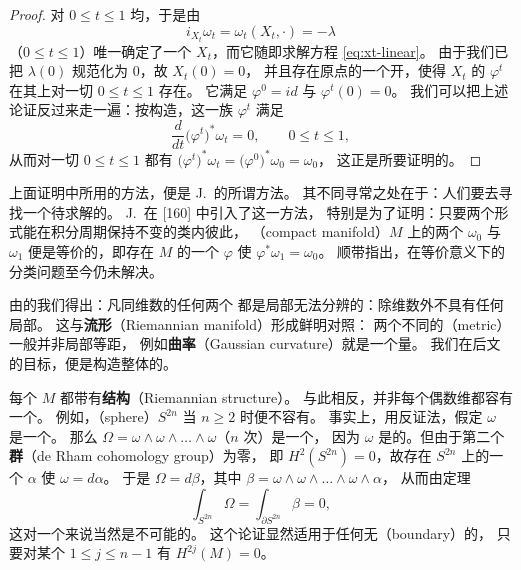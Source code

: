 \begin{proof}
对 $0\le t\le1$ 均\trNondegenerate，于是由
\[
i_{X_t}\omega_t=\omega_t(X_t,\cdot)=-\lambda
\]
（$0\le t\le1$）唯一确定了一个\trVectorField{} $X_t$，而它随即求解方程 \eqref{eq:xt-linear}。%
由于我们已把 $\lambda(0)$ 规范化为 $0$，故 $X_t(0)=0$，%
并且存在原点的一个开\trNeighborhood，使得 $X_t$ 的\trFlow{} $\varphi^{t}$ 在其上对一切 $0\le t\le1$ 存在。%
它满足 $\varphi^{0}=id$ 与 $\varphi^{t}(0)=0$。%
我们可以把上述论证反过来走一遍：按构造，这一族\trDiffeomorphism{} $\varphi^{t}$ 满足
\[
\frac{d}{dt}\bigl(\varphi^{t}\bigr)^{*}\omega_t=0,\qquad 0\le t\le1,
\]
从而对一切 $0\le t\le1$ 都有
$\bigl(\varphi^{t}\bigr)^{*}\omega_t=\bigl(\varphi^{0}\bigr)^{*}\omega_0=\omega_0$，%
这正是所要证明的。
\end{proof}

上面证明中所用的方法，便是 J.~\trMoser{}的所谓\trDeformation{}方法。%
其不同寻常之处在于：人们要去寻找一个待求解的\trDifferentialEquation。%
J.~\trMoser{}在 [160] 中引入了这一方法，%
特别是为了证明：只要两个形式能在积分周期保持不变的\trSymplecticForm{}类内彼此\trDeformation，%
\textbf{\trCompact\trManifold}（compact manifold）$M$ 上的两个\trSymplecticStructure{}%
$\omega_0$ 与 $\omega_1$ 便是等价的，即存在 $M$ 的一个\trDiffeomorphism{} $\varphi$%
使 $\varphi^{*}\omega_1=\omega_0$。%
顺带指出，\trSymplecticForm{}在等价意义下的分类问题至今仍未解决。

由\trDarboux{}的\trNormalForm{}我们得出：凡同维数的任何两个\trSymplecticManifold{}%
都是局部无法分辨的：\trSymplecticManifold{}除维数外不具有任何局部\trSymplecticInvariant。%
这与\textbf{\trRiemann{}流形}（Riemannian manifold）形成鲜明对照：%
两个不同的\textbf{\trMetric}（metric）一般并非局部等距，%
例如\textbf{\trGauss{}曲率}（Gaussian curvature）就是一个\trInvariant{}量。%
我们在后文的目标，便是构造整体的\trSymplecticInvariant。

每个\trManifold{} $M$ 都带有\textbf{\trRiemann{}结构}（Riemannian structure）。%
与此相反，并非每个偶数维\trManifold{}都容有一个\trSymplecticStructure。%
例如，\textbf{\trSphere}（sphere）$S^{2n}$ 当 $n\ge2$ 时便不容有\trSymplecticStructure。%
事实上，用反证法，假定 $\omega$ 是一个\trSymplecticStructure。%
那么 $\Omega=\omega\wedge\omega\wedge\dots\wedge\omega$（$n$ 次）是一个\trVolumeForm，%
因为 $\omega$ 是\trNondegenerate{}的。但由于第二个%
\textbf{\trDeRham\trCohomology{}群}（de Rham cohomology group）为零，%
即 $H^{2}(S^{2n})=0$，故存在 $S^{2n}$ 上的一个\trOneForm{} $\alpha$ 使 $\omega=d\alpha$。%
于是 $\Omega=d\beta$，其中 $\beta=\omega\wedge\omega\wedge\dots\wedge\omega\wedge\alpha$，%
从而由\trStokes{}定理
\[
\int_{S^{2n}}\Omega=\int_{\partial S^{2n}}\beta=0,
\]
这对一个\trVolumeForm{}来说当然是不可能的。%
这个论证显然适用于任何无\textbf{\trBoundary}（boundary）的\trCompact\trManifold，%
只要对某个 $1\le j\le n-1$ 有 $H^{2j}(M)=0$。

